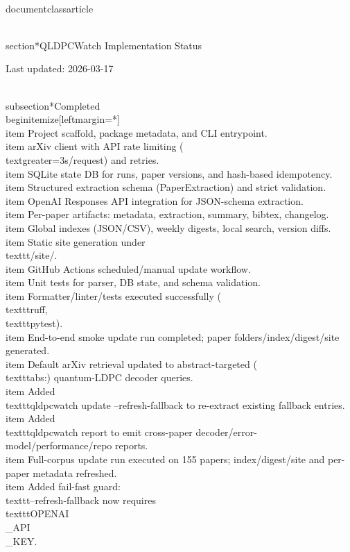 \\documentclass{article}
\begin{document}
\\section*{QLDPCWatch Implementation Status}

Last updated: 2026-03-17

\\subsection*{Completed}
\\begin{itemize}[leftmargin=*]
  \\item Project scaffold, package metadata, and CLI entrypoint.
  \\item arXiv client with API rate limiting (\\textgreater{}=3s/request) and retries.
  \\item SQLite state DB for runs, paper versions, and hash-based idempotency.
  \\item Structured extraction schema (PaperExtraction) and strict validation.
  \\item OpenAI Responses API integration for JSON-schema extraction.
  \\item Per-paper artifacts: metadata, extraction, summary, bibtex, changelog.
  \\item Global indexes (JSON/CSV), weekly digests, local search, version diffs.
  \\item Static site generation under \\texttt{/site/}.
  \\item GitHub Actions scheduled/manual update workflow.
  \\item Unit tests for parser, DB state, and schema validation.
  \\item Formatter/linter/tests executed successfully (\\texttt{ruff}, \\texttt{pytest}).
  \\item End-to-end smoke update run completed; paper folders/index/digest/site generated.
  \\item Default arXiv retrieval updated to abstract-targeted (\\texttt{abs:}) quantum-LDPC decoder queries.
  \\item Added \\texttt{qldpcwatch update --refresh-fallback} to re-extract existing fallback entries.
  \\item Added \\texttt{qldpcwatch report} to emit cross-paper decoder/error-model/performance/repo reports.
  \\item Full-corpus update run executed on 155 papers; index/digest/site and per-paper metadata refreshed.
  \\item Added fail-fast guard: \\texttt{--refresh-fallback} now requires \\texttt{OPENAI\\_API\\_KEY}.
\end{document}
